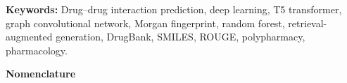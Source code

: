 \documentclass[12pt,a4paper,oneside]{report}
\begin{document}
\vspace{0.5cm}
\noindent\textbf{Keywords:} Drug--drug interaction prediction, deep learning, T5 transformer,
graph convolutional network, Morgan fingerprint, random forest, retrieval-augmented generation,
DrugBank, SMILES, ROUGE, polypharmacy, pharmacology.

\newpage
\listoffigures
{}

\newpage
\listoftables
{}

\newpage
\begin{center}
{\Large\bfseries Nomenclature}
\end{center}
\vspace{0.5cm}
\end{document}
